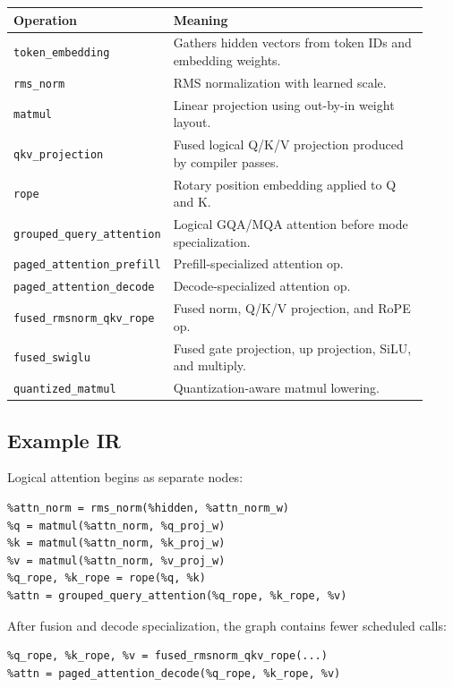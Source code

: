 \documentclass[11pt]{article}
\begin{document}
\begin{longtable}{p{0.30\linewidth}p{0.62\linewidth}}
\toprule
\textbf{Operation} & \textbf{Meaning} \\
\midrule
\texttt{token\_embedding} & Gathers hidden vectors from token IDs and embedding
weights. \\
\texttt{rms\_norm} & RMS normalization with learned scale. \\
\texttt{matmul} & Linear projection using out-by-in weight layout. \\
\texttt{qkv\_projection} & Fused logical Q/K/V projection produced by compiler
passes. \\
\texttt{rope} & Rotary position embedding applied to Q and K. \\
\texttt{grouped\_query\_attention} & Logical GQA/MQA attention before mode
specialization. \\
\texttt{paged\_attention\_prefill} & Prefill-specialized attention op. \\
\texttt{paged\_attention\_decode} & Decode-specialized attention op. \\
\texttt{fused\_rmsnorm\_qkv\_rope} & Fused norm, Q/K/V projection, and RoPE op. \\
\texttt{fused\_swiglu} & Fused gate projection, up projection, SiLU, and multiply. \\
\texttt{quantized\_matmul} & Quantization-aware matmul lowering. \\
\bottomrule
\end{longtable}

\subsection{Example IR}

Logical attention begins as separate nodes:

\begin{lstlisting}
%attn_norm = rms_norm(%hidden, %attn_norm_w)
%q = matmul(%attn_norm, %q_proj_w)
%k = matmul(%attn_norm, %k_proj_w)
%v = matmul(%attn_norm, %v_proj_w)
%q_rope, %k_rope = rope(%q, %k)
%attn = grouped_query_attention(%q_rope, %k_rope, %v)
\end{lstlisting}

After fusion and decode specialization, the graph contains fewer scheduled calls:

\begin{lstlisting}
%q_rope, %k_rope, %v = fused_rmsnorm_qkv_rope(...)
%attn = paged_attention_decode(%q_rope, %k_rope, %v)
\end{lstlisting}
\end{document}
